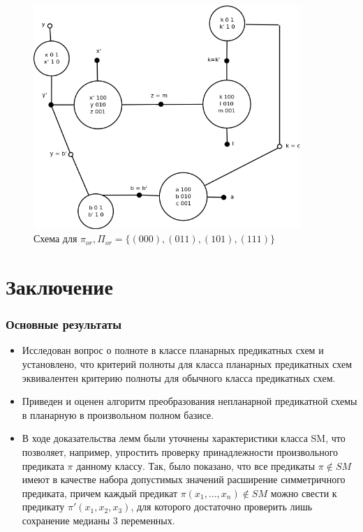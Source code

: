 \documentclass[12pt]{extarticle}
\begin{document}
\begin{figure}[htb]
\centering
\includegraphics[width=0.9\textwidth]{min_or.png}
\caption{Схема для $\pi_{or}, \Pi_{or} = \{ (000), (011), (101), (111) \}$}
\label{fig:or}
\end{figure}

\clearpage
\section{Заключение}
\subsubsection*{Основные результаты}

\begin{itemize}
\item Исследован вопрос о полноте в классе планарных предикатных схем и установлено, что 
критерий полноты для класса планарных предикатных схем эквивалентен критерию полноты для обычного
класса предикатных схем. 
\item Приведен и оценен алгоритм преобразования непланарной предикатной схемы в планарную 
в произвольном полном базисе. 
\item
В ходе доказательства лемм были уточнены характеристики класса SM, что 
позволяет, например, упростить проверку принадлежности произвольного предиката $\pi$ данному классу. 
Так, было показано, что все предикаты $\pi \notin SM$ имеют в качестве набора допустимых значений расширение симметричного
предиката, причем каждый предикат $\pi(x_1, \dots, x_n) \notin SM$ можно свести к предикату $\pi'(x_1, x_2, x_3)$, 
для которого достаточно проверить лишь сохранение медианы 3 переменных.
\end{itemize}
\end{document}
